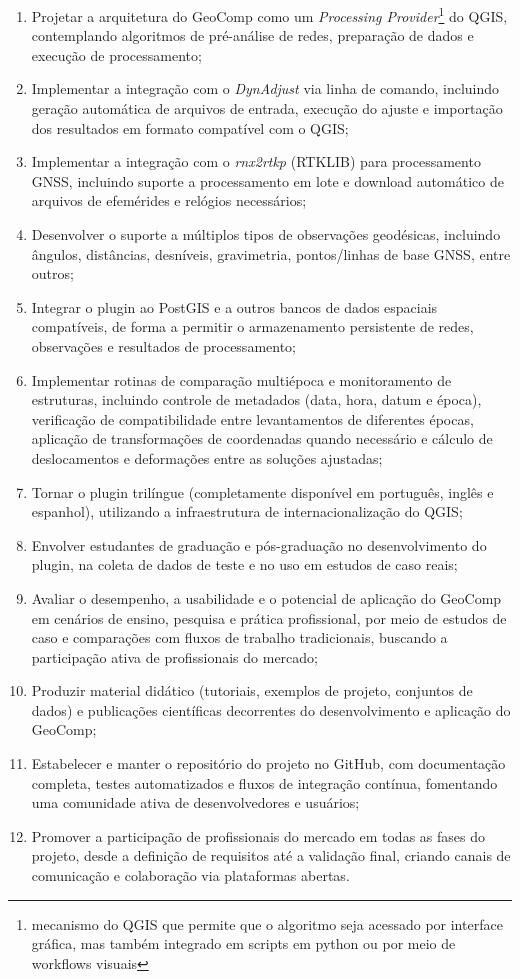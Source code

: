 \documentclass[
        12pt,                           %
        openright,                      %
        oneside,
        a4paper,                        %
        chapter=TITLE,         %
        section=TITLE,         %
        subsection=Title,      %
        english,                        %
        portugues,                      %
        ]{abntex2}
\begin{document}
\begin{enumerate}[label=O\arabic*.]
    \item Projetar a arquitetura do GeoComp como um \textit{Processing Provider}\footnote{mecanismo do QGIS que permite que o algoritmo seja acessado por interface gráfica, mas também integrado em scripts em python ou por meio de workflows visuais\cite{qgis_processing_manual}} do QGIS, contemplando algoritmos de pré-análise de redes, preparação de dados e execução de processamento;
    \item Implementar a integração com o \textit{DynAdjust} via linha de comando, incluindo geração automática de arquivos de entrada, execução do ajuste e importação dos resultados em formato compatível com o QGIS;
    \item Implementar a integração com o \textit{rnx2rtkp} (RTKLIB) para processamento GNSS, incluindo suporte a processamento em lote e download automático de arquivos de efemérides e relógios necessários;
    \item Desenvolver o suporte a múltiplos tipos de observações geodésicas, incluindo ângulos, distâncias, desníveis, gravimetria, pontos/linhas de base GNSS, entre outros;
    \item Integrar o plugin ao PostGIS e a outros bancos de dados espaciais compatíveis, de forma a permitir o armazenamento persistente de redes, observações e resultados de processamento;
    \item Implementar rotinas de comparação multiépoca e monitoramento de estruturas, incluindo controle de metadados (data, hora, datum e época), verificação de compatibilidade entre levantamentos de diferentes épocas, aplicação de transformações de coordenadas quando necessário e cálculo de deslocamentos e deformações entre as soluções ajustadas;
    \item Tornar o plugin trilíngue (completamente disponível em português, inglês e espanhol), utilizando a infraestrutura de internacionalização do QGIS;
    \item Envolver estudantes de graduação e pós-graduação no desenvolvimento do plugin, na coleta de dados de teste e no uso em estudos de caso reais;
    \item Avaliar o desempenho, a usabilidade e o potencial de aplicação do GeoComp em cenários de ensino, pesquisa e prática profissional, por meio de estudos de caso e comparações com fluxos de trabalho tradicionais, buscando a participação ativa de profissionais do mercado;
    \item Produzir material didático (tutoriais, exemplos de projeto, conjuntos de dados) e publicações científicas decorrentes do desenvolvimento e aplicação do GeoComp;
    \item Estabelecer e manter o repositório do projeto no GitHub, com documentação completa, testes automatizados e fluxos de integração contínua, fomentando uma comunidade ativa de desenvolvedores e usuários;
    \item Promover a participação de profissionais do mercado em todas as fases do projeto, desde a definição de requisitos até a validação final, criando canais de comunicação e colaboração via plataformas abertas.
\end{enumerate}
\end{document}
